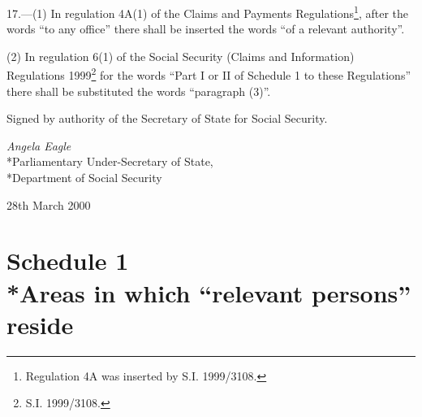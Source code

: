 \documentclass[12pt,a4paper]{article}
\begin{document}
17.---(1)  In regulation 4A(1) of the Claims and Payments Regulations\footnote{\frenchspacing Regulation 4A was inserted by S.I. 1999/3108.}, after the words “to any office” there shall be inserted the words “of a relevant authority”.

(2) In regulation 6(1) of the Social Security (Claims and Information) Regulations 1999\footnote{\frenchspacing S.I. 1999/3108.} for the words “Part I or II of Schedule 1 to these Regulations” there shall be substituted the words “paragraph (3)”. 

\bigskip

Signed 
by authority of the Secretary of State for Social Security.

{\raggedleft
\emph{Angela Eagle
}\\*Parliamentary Under-Secretary of State,\\*Department of Social Security

}

28th March 2000

\small

\part[Schedule 1 --- Areas in which “relevant persons” reside]{Schedule 1\\*Areas in which ``relevant persons'' reside}

\renewcommand\parthead{--- Schedule 1}
\end{document}

